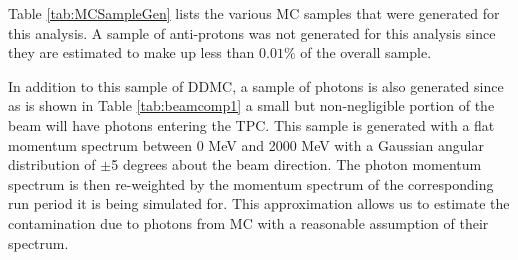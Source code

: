 Table \ref{tab:MCSampleGen} lists the various MC samples that were generated for this analysis. A sample of anti-protons was not generated for this analysis since they are estimated to make up less than $0.01\%$ of the overall sample.

\begin{table}[htb]
	\begin{center}
	\caption{Summary of MC generated for the analysis.} \label{tab:MCSampleGen}
	\end{center}
\end{table}

In addition to this sample of DDMC, a sample of photons is also generated since as is shown in Table \ref{tab:beamcomp1} a small but non-negligible portion of the beam will have photons entering the TPC. This sample is generated with a flat momentum spectrum between 0 MeV and 2000 MeV with a Gaussian angular distribution of $\pm$5 degrees about the beam direction. The photon momentum spectrum is then re-weighted by the momentum spectrum of the corresponding run period it is being simulated for. This approximation allows us to estimate the contamination due to photons from MC with a reasonable assumption of their spectrum.